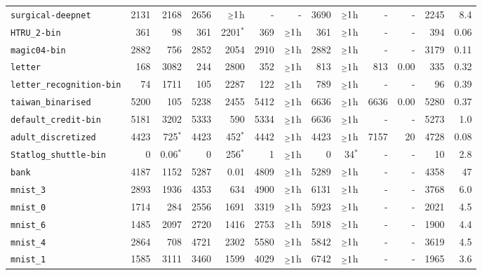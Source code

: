 \begin{tabular}{lrrrrrrrrrrrr}
\texttt{surgical-deepnet} & 2131 & 2168 & 2656 & $\mathsmaller{\geq}1$h & - & - & 3690 & $\mathsmaller{\geq}1$h & - & - & 2245 & 8.4\\
\texttt{HTRU\_2-bin} & 361 & 98 & 361 & 2201$^*$ & 369 & $\mathsmaller{\geq}1$h & 361 & $\mathsmaller{\geq}1$h & - & - & 394 & 0.06\\
\texttt{magic04-bin} & 2882 & 756 & 2852 & 2054 & 2910 & $\mathsmaller{\geq}1$h & 2882 & $\mathsmaller{\geq}1$h & - & - & 3179 & 0.11\\
\texttt{letter} & 168 & 3082 & 244 & 2800 & 352 & $\mathsmaller{\geq}1$h & 813 & $\mathsmaller{\geq}1$h & 813 & 0.00 & 335 & 0.32\\
\texttt{letter\_recognition-bin} & 74 & 1711 & 105 & 2287 & 122 & $\mathsmaller{\geq}1$h & 789 & $\mathsmaller{\geq}1$h & - & - & 96 & 0.39\\
\texttt{taiwan\_binarised} & 5200 & 105 & 5238 & 2455 & 5412 & $\mathsmaller{\geq}1$h & 6636 & $\mathsmaller{\geq}1$h & 6636 & 0.00 & 5280 & 0.37\\
\texttt{default\_credit-bin} & 5181 & 3202 & 5333 & 590 & 5334 & $\mathsmaller{\geq}1$h & 6636 & $\mathsmaller{\geq}1$h & - & - & 5273 & 1.0\\
\texttt{adult\_discretized} & 4423 & 725$^*$ & 4423 & 452$^*$ & 4442 & $\mathsmaller{\geq}1$h & 4423 & $\mathsmaller{\geq}1$h & 7157 & 20 & 4728 & 0.08\\
\texttt{Statlog\_shuttle-bin} & 0 & 0.06$^*$ & 0 & 256$^*$ & 1 & $\mathsmaller{\geq}1$h & 0 & 34$^*$ & - & - & 10 & 2.8\\
\texttt{bank} & 4187 & 1152 & 5287 & 0.01 & 4809 & $\mathsmaller{\geq}1$h & 5289 & $\mathsmaller{\geq}1$h & - & - & 4358 & 47\\
\texttt{mnist\_3} & 2893 & 1936 & 4353 & 634 & 4900 & $\mathsmaller{\geq}1$h & 6131 & $\mathsmaller{\geq}1$h & - & - & 3768 & 6.0\\
\texttt{mnist\_0} & 1714 & 284 & 2556 & 1691 & 3319 & $\mathsmaller{\geq}1$h & 5923 & $\mathsmaller{\geq}1$h & - & - & 2021 & 4.5\\
\texttt{mnist\_6} & 1485 & 2097 & 2720 & 1416 & 2753 & $\mathsmaller{\geq}1$h & 5918 & $\mathsmaller{\geq}1$h & - & - & 1900 & 4.4\\
\texttt{mnist\_4} & 2864 & 708 & 4721 & 2302 & 5580 & $\mathsmaller{\geq}1$h & 5842 & $\mathsmaller{\geq}1$h & - & - & 3619 & 4.5\\
\texttt{mnist\_1} & 1585 & 3111 & 3460 & 1599 & 4029 & $\mathsmaller{\geq}1$h & 6742 & $\mathsmaller{\geq}1$h & - & - & 1965 & 3.6\\

\end{tabular}
